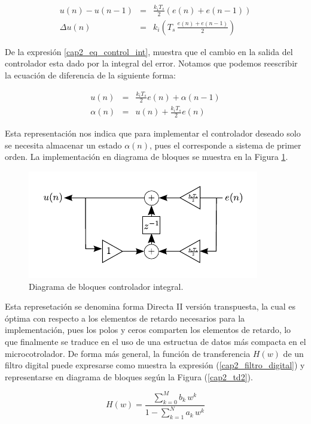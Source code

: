 \begin{eqnarray}
u(n)- u(n-1) &=&  \frac{k_i T_s}{2}(e(n)+e(n-1)) \\
\Delta u(n) &=& k_i \left( T_s \, \frac{e(n)+e(n-1)}{2} \right) \label{cap2_eq_control_int}
\end{eqnarray}

De la expresión \ref{cap2_eq_control_int}, muestra que el cambio en la salida del controlador esta dado por la integral del error. Notamos que podemos reescribir la ecuación de diferencia de la siguiente forma:

\begin{eqnarray}
u(n) &=&  \frac{k_i T_s}{2} e(n) + \alpha(n-1) \\
\alpha(n) &=& u(n) + \frac{k_i T_s}{2} e(n)
\end{eqnarray}

Esta representación nos indica que para implementar el controlador deseado solo se necesita almacenar un estado $\alpha(n)$, pues el corresponde a sistema de primer orden. La implementación en diagrama de bloques se muestra en la Figura \ref{cap2_block_integral}.

\begin{figure}[H]
  \centering
  \includegraphics[scale=1.5]{img/cap2/block_pi}
  \caption{Diagrama de bloques controlador integral.}
  \label{cap2_block_integral}
\end{figure}

Esta represetación se denomina forma Directa II versión transpuesta, la cual es óptima con respecto a los elementos de retardo necesarios para la implementación, pues los polos y ceros comparten los elementos de retardo, lo que finalmente se traduce en el uso de una estructua de datos más compacta en el microcotrolador. De forma más general, la función de transferencia $H(w)$ de un filtro digital puede expresarse como muestra la expresión (\ref{cap2_filtro_digital}) y representarse en diagrama de bloques según la Figura (\ref{cap2_td2}).

\begin{equation}
H(w) = \frac{\sum_{k=0}^{M} b_k \, w^k}{1-\sum_{k=1}^{N} a_k \, w^k}\label{cap2_filtro_digital}
\end{equation}

